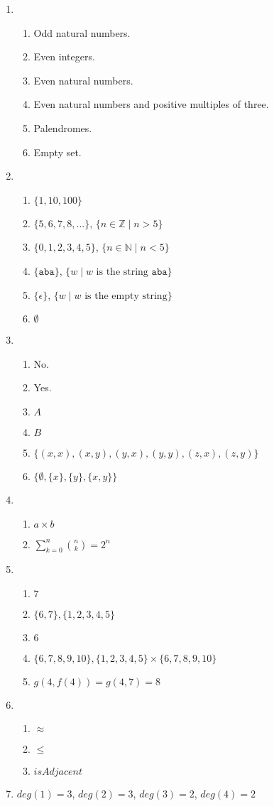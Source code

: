 \documentclass[11pt]{article}
\begin{document}
\begin{enumerate}[0.1]
  \item
  \begin{enumerate}
    \item Odd natural numbers.
    \item Even integers.
    \item Even natural numbers.
    \item Even natural numbers and positive multiples of three.
    \item Palendromes.
    \item Empty set.
  \end{enumerate}
  \item
  \begin{enumerate}
    \item $\{1,10,100\}$
    \item $\{5,6,7,8,...\}$, $\{n \in \mathbb{Z} \mid n > 5\}$
    \item $\{0,1,2,3,4,5\}$, $\{n \in \mathbb{N} \mid n < 5\}$
    \item $\{\texttt{aba}\}$, $\{w \mid w \text{ is the string } \texttt{aba}\}$
    \item $\{\epsilon\}$, $\{w \mid w \text{ is the empty string}\}$
    \item $\emptyset$
  \end{enumerate}
  \item
  \begin{enumerate}
    \item No.
    \item Yes.
    \item $A$
    \item $B$
    \item $\{(x,x),(x,y),(y,x),(y,y),(z,x),(z,y)\}$
    \item $\{\emptyset,\{x\},\{y\},\{x,y\}\}$
  \end{enumerate}
  \item
  \begin{enumerate}
    \item $a \times b$
    \item $\sum_{k=0}^n \binom{n}{k} = 2^n$
  \end{enumerate}
  \item
  \begin{enumerate}
    \item $7$
    \item $\{6,7\}, \{1,2,3,4,5\}$
    \item $6$
    \item $\{6,7,8,9,10\}, \{1,2,3,4,5\} \times \{6,7,8,9,10\}$
    \item $g(4, f(4)) = g(4, 7) = 8$
  \end{enumerate}
  \item
  \begin{enumerate}
    \item $\approx$
    \item $\leq$
    \item $isAdjacent$
  \end{enumerate}
  \item $deg(1)=3$, $deg(2)=3$, $deg(3)=2$, $deg(4)=2$
\end{enumerate}
\end{document}
